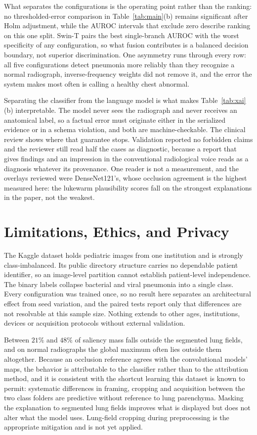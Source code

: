 \documentclass[conference]{IEEEtran}
\begin{document}
What separates the configurations is the operating point rather than the
ranking: no thresholded-error comparison in Table~\ref{tab:main}(b) remains
significant after Holm adjustment, while the AUROC intervals that exclude
zero describe ranking on this one split.
Swin-T pairs the best single-branch AUROC with the worst specificity of any
configuration, so what fusion contributes is a balanced decision boundary,
not superior discrimination. One asymmetry runs through every row: all five
configurations detect pneumonia more reliably than they recognize a normal
radiograph, inverse-frequency weights did not remove it, and the error the
system makes most often is calling a healthy chest abnormal.

Separating the classifier from the language model is what makes
Table~\ref{tab:xai}(b) interpretable. The model never sees the radiograph
and never receives an anatomical label, so a factual error must originate
either in the serialized evidence or in a schema violation, and both are
machine-checkable. The clinical review shows where that guarantee stops.
Validation reported no forbidden claims and the reviewer still read half the
cases as diagnostic, because a report that gives findings and an impression
in the conventional radiological voice reads as a diagnosis whatever its
provenance. One reader is not a measurement, and the overlays reviewed were
DenseNet121's, whose occlusion agreement is the highest measured here: the
lukewarm plausibility scores fall on the strongest explanations in the
paper, not the weakest.

\section{Limitations, Ethics, and Privacy}
The Kaggle dataset holds pediatric images from one institution and is
strongly class-imbalanced. Its public directory structure carries no
dependable patient identifier, so an image-level partition cannot establish
patient-level independence. The binary labels collapse bacterial and viral
pneumonia into a single class. Every configuration was trained once, so no
result here separates an architectural effect from seed variation, and the
paired tests report only that differences are not resolvable at this sample
size. Nothing extends to other ages, institutions, devices or acquisition
protocols without external validation.

Between $21\%$ and $48\%$ of saliency mass falls outside the segmented lung
fields, and on normal radiographs the global maximum often lies outside them
altogether. Because an occlusion
reference agrees with the convolutional models' maps, the behavior is
attributable to the classifier rather than to the attribution method, and it
is consistent with the shortcut learning this dataset is known to permit: systematic differences in
framing, cropping and acquisition between the two class folders are
predictive without reference to lung parenchyma. Masking the explanation to
segmented lung fields improves what is displayed but does not alter what the
model uses. Lung-field cropping during preprocessing is the appropriate
mitigation and is not yet applied.
\end{document}
